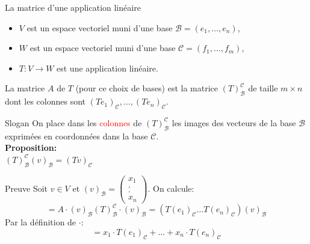 

\begin{parag}{La matrice d'une application linéaire}
    \begin{itemize}
        \item $V$ est un espace vectoriel muni d'une base $\mathcal{B} = \left(e_1, \dots, e_n \right)$,
        \item $W$ est un espace vectoriel muni d'une base $\mathcal{C} = \left(f_1, \dots, f_m\right)$,
        \item $T : V \to W$ est une application linéaire.
    \end{itemize}


    \begin{definition}
        La matrice $A$ de $T$ (pour ce choix de bases) est la matrice $\left(T\right)_{\mathcal{B}}^{\mathcal{C}}$ de taille $m \times n$ dont les colonnes sont $\left(Te_1\right)_{\mathcal{C}}, \dots, \left(Te_n\right)_{\mathcal{C}}$.
    \end{definition}
    \begin{subparag}{Slogan}
        On place dans les \textcolor{red}{colonnes} de $\left(T\right)_{\mathcal{B}}^{\mathcal{C}}$ les images des vecteurs de la base $\mathcal{B}$ exprimées en coordonnées dans la base $\mathcal{C}$.
        \\
        \textbf{Proposition:} \\
        $\left(T\right)_{\mathcal{B}}^{\mathcal{C}}\left(v\right)_{\mathcal{B}} = \left(Tv\right)_{\mathcal{C}}$
    \end{subparag}
    \begin{subparag}{Preuve}
        Soit $v \in V$ et $\left(v\right)_{\mathcal{B}} = \begin{pmatrix}
            x_1 \\ . \\ . \\ x_n
        \end{pmatrix}$. On calcule:
        \[ = A \cdot \left(v\right)_{\mathcal{B}} \left(T\right)_{\mathcal{B}}^{\mathcal{C}}\cdot\left(v\right)_{\mathcal{B}} = \left(T\left(e_1\right)_{\mathcal{C}} \dots T\left(e_n\right)_{\mathcal{C}}\right)\left(v\right)_{\mathcal{B}}\]
        Par la définition de $\cdot$:
        \[= x_1 \cdot T\left(e_1\right)_{\mathcal{C}} + \dots + x_n \cdot T\left(e_n\right)_{\mathcal{C}}\]


\end{subparag}
\end{parag}
